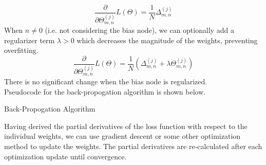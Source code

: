 \documentclass[a4paper,12pt]{article}
\numberwithin{equation}{section}
\begin{document}
\[\frac{\partial}{\partial \Theta^{(j)}_{m,n}}L(\Theta)=\frac1N \Delta_{m,n}^{(j)}\]
When $n\neq0$ (i.e. not considering the bias node), we can optionally add a regularizer term $\lambda > 0$ which decreases the magnitude of the weights, preventing overfitting. 
\[\frac{\partial}{\partial \Theta^{(j)}_{m,n}}L(\Theta)=\frac1N (\Delta_{m,n}^{(j)}+\lambda \Theta_{m,n}^{(j)})\]
There is no significant change when the bias node is regularized.\\
Pseudocode for the back-propogation algorithm is shown below.\\
\begin{algorithm}
\caption{Back-Propogation Algorithm}
\BlankLine
{}
\end{algorithm}
Having derived the partial derivatives of the loss function with respect to the individual weights, we can use gradient descent or some other optimization method to update the weights. The partial derivatives are re-calculated after each optimization update until convergence.
\newpage
\end{document}
